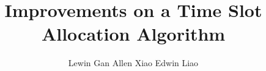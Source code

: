 \documentclass{vldb}
\begin{document}

\title{Improvements on a Time Slot Allocation Algorithm
}


%
%
%
%


\author{
%
%
\alignauthor
Lewin Gan
\alignauthor
Allen Xiao
\alignauthor
Edwin Liao
}
\end{document}
